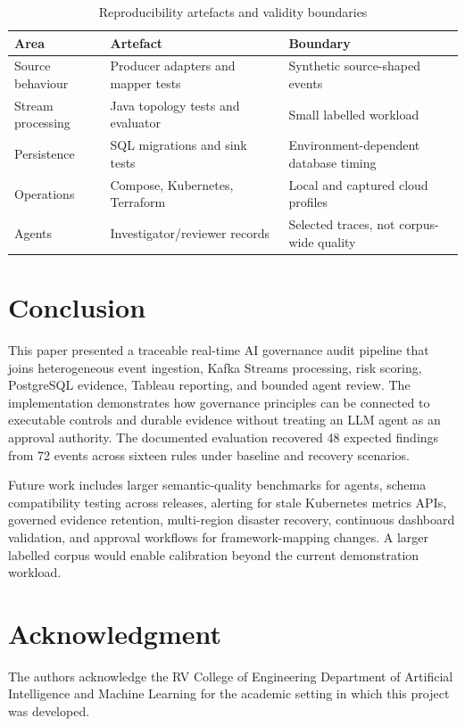 \documentclass[conference]{IEEEtran}
\begin{document}
\begin{table}[t]\caption{Reproducibility artefacts and validity boundaries}\label{tab:validity}\centering\scriptsize\begin{tabular}{p{1.75cm}p{2.5cm}p{2.15cm}}\toprule\textbf{Area} & \textbf{Artefact} & \textbf{Boundary}\\\midrule Source behaviour & Producer adapters and mapper tests & Synthetic source-shaped events\\ Stream processing & Java topology tests and evaluator & Small labelled workload\\ Persistence & SQL migrations and sink tests & Environment-dependent database timing\\ Operations & Compose, Kubernetes, Terraform & Local and captured cloud profiles\\ Agents & Investigator/reviewer records & Selected traces, not corpus-wide quality\\\bottomrule\end{tabular}\end{table}

\section{Conclusion}
This paper presented a traceable real-time AI governance audit pipeline that joins heterogeneous event ingestion, Kafka Streams processing, risk scoring, PostgreSQL evidence, Tableau reporting, and bounded agent review. The implementation demonstrates how governance principles can be connected to executable controls and durable evidence without treating an LLM agent as an approval authority. The documented evaluation recovered 48 expected findings from 72 events across sixteen rules under baseline and recovery scenarios.

Future work includes larger semantic-quality benchmarks for agents, schema compatibility testing across releases, alerting for stale Kubernetes metrics APIs, governed evidence retention, multi-region disaster recovery, continuous dashboard validation, and approval workflows for framework-mapping changes. A larger labelled corpus would enable calibration beyond the current demonstration workload.

\section*{Acknowledgment}
The authors acknowledge the RV College of Engineering Department of Artificial Intelligence and Machine Learning for the academic setting in which this project was developed.
\end{document}

